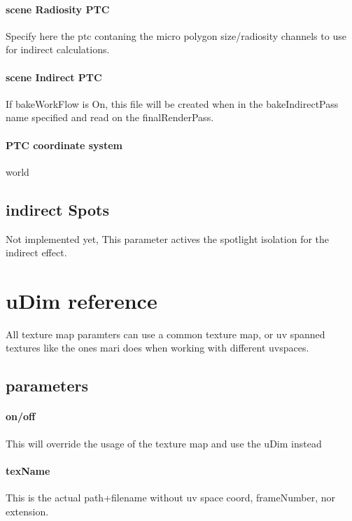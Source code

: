 \documentclass[final,letterpaper,twoside,12pt]{report}
\begin{document}
\subsubsection {scene Radiosity PTC}
Specify here the ptc contaning the micro polygon size/radiosity channels to use for indirect calculations.
\smallskip
\subsubsection {scene Indirect PTC}
If bakeWorkFlow is On, this file will be created when in the bakeIndirectPass name specified and read on the finalRenderPass.
\smallskip
\subsubsection {PTC coordinate system}
world
\smallskip

\section {indirect Spots}
Not implemented yet, This parameter actives the spotlight isolation for the indirect effect.
\smallskip


\chapter{uDim reference}
All texture map paramters can use a common texture map, or uv spanned textures like the ones mari does when working with different uvspaces.
\smallskip
\section {parameters}
\subsubsection {on/off}
This will override the usage of the texture map and use the uDim instead
\smallskip
\subsubsection {texName}
This is the actual path+filename without uv space coord, frameNumber, nor extension.
\smallskip
\end{document}
